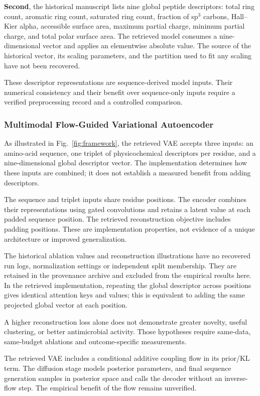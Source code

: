 \documentclass[journal]{IEEEtran}
\begin{document}
\textbf{Second}, the historical manuscript lists nine global peptide descriptors: total ring count, aromatic ring count, saturated ring count, fraction of sp$^3$ carbons, Hall--Kier alpha, accessible surface area, maximum partial charge, minimum partial charge, and total polar surface area. The retrieved model consumes a nine-dimensional vector and applies an elementwise absolute value. The source of the historical vector, its scaling parameters, and the partition used to fit any scaling have not been recovered.

These descriptor representations are sequence-derived model inputs. Their numerical consistency and their benefit over sequence-only inputs require a verified preprocessing record and a controlled comparison.

\subsubsection{Multimodal Flow-Guided Variational Autoencoder}

As illustrated in Fig.~\ref{fig:framework}, the retrieved VAE accepts three inputs: an amino-acid sequence, one triplet of physicochemical descriptors per residue, and a nine-dimensional global descriptor vector. The implementation determines how these inputs are combined; it does not establish a measured benefit from adding descriptors.

The sequence and triplet inputs share residue positions. The encoder combines their representations using gated convolutions and retains a latent value at each padded sequence position. The retrieved reconstruction objective includes padding positions. These are implementation properties, not evidence of a unique architecture or improved generalization.

The historical ablation values and reconstruction illustrations have no recovered run logs, normalization settings or independent split membership. They are retained in the provenance archive and excluded from the empirical results here. In the retrieved implementation, repeating the global descriptor across positions gives identical attention keys and values; this is equivalent to adding the same projected global vector at each position.

A higher reconstruction loss alone does not demonstrate greater novelty, useful clustering, or better antimicrobial activity. Those hypotheses require same-data, same-budget ablations and outcome-specific measurements.

The retrieved VAE includes a conditional additive coupling flow in its prior/KL term. The diffusion stage models posterior parameters, and final sequence generation samples in posterior space and calls the decoder without an inverse-flow step. The empirical benefit of the flow remains unverified.
\end{document}
